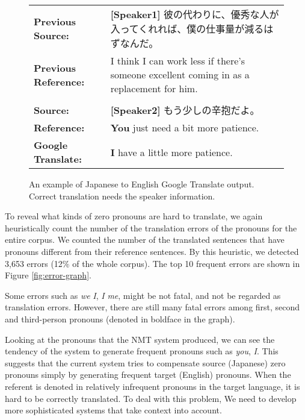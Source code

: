\documentclass[11pt,a4paper]{article}
\begin{document}
\begin{CJK}{UTF8}{min}
\begin{figure*}[t]
\begin{small}
  \begin{tabular}{lp{12.5cm}}
   \bf Previous Source: & {\bf [Speaker1]} 彼の代わりに、優秀な人が入ってくれれば、僕の仕事量が減るはずなんだ。 \\
   \bf Previous Reference: & I think I can work less if there's someone excellent coming in as a replacement for him. \\\\


   \bf Source: & {\bf [Speaker2]} もう少しの辛抱だよ。 \\
   \bf Reference: & {\bf You} just need a bit more patience. \\
   \bf Google Translate: & {\bf I} have a little more patience.\\
  \end{tabular}
  \caption{An example of Japanese to English Google Translate output. Correct translation needs the speaker information.}

  \label{fig:google-error-example2}
\end{small}
\end{figure*}
\end{CJK}


To reveal what kinds of zero pronouns are hard to translate, we again heuristically count the number of the translation errors of the pronouns for the entire corpus. We counted the number of the translated sentences that have pronouns different from their reference sentences. By this heuristic, we detected 3,653 errors (12\% of the whole corpus). The top 10 frequent errors are shown in Figure \ref{fig:error-graph}.

Some errors such as {\it we}  {\it I}, {\it I}  {\it me}, might be not fatal, and not be regarded as translation errors. However, there are still many fatal errors among first, second and third-person pronouns (denoted in boldface in the graph).

Looking at the pronouns that the NMT system produced, we can see the tendency of the system to generate frequent pronouns such as {\it you}, {\it I}. This suggests that the current system tries to compensate source (Japanese) zero pronouns simply by generating frequent target (English) pronouns. When the referent is denoted in relatively infrequent pronouns in the target language, it is hard to be correctly translated. To deal with this problem, We need to develop more sophisticated systems that take context into account.
\end{document}
